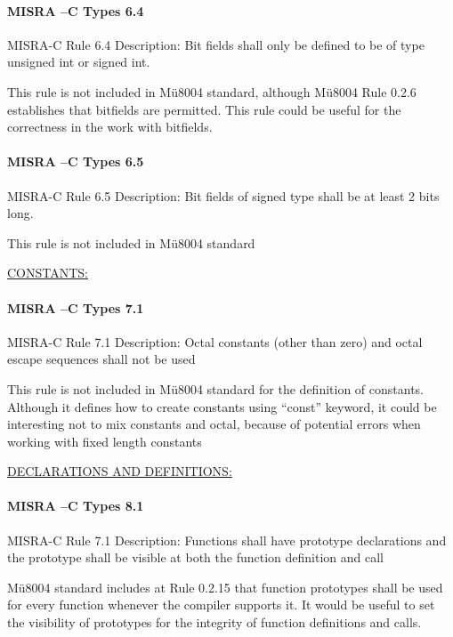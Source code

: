 \paragraph{MISRA –C Types 6.4}
MISRA-C Rule 6.4 Description: Bit fields shall only be defined to be of type unsigned int or signed int.

This rule is not included in Mü8004 standard, although Mü8004 Rule 0.2.6 establishes that bitfields are permitted. This rule could be useful for the correctness in the work with bitfields.

\paragraph{MISRA –C Types 6.5}
MISRA-C Rule 6.5 Description: Bit fields of signed type shall be at least 2 bits long.

This rule is not included in Mü8004 standard

\begin{center}
\textsc{\underline{CONSTANTS:}}
\end{center}

\paragraph{MISRA –C Types 7.1}
MISRA-C Rule 7.1 Description: Octal constants (other than zero) and octal escape sequences shall not be used

This rule is not included in Mü8004 standard for the definition of constants. Although it defines how to create constants using “const” keyword, it could be interesting not to mix constants and octal, because of potential errors when working with fixed length constants

\begin{center}
\textsc{\underline{DECLARATIONS AND DEFINITIONS:}}
\end{center}

\paragraph{MISRA –C Types 8.1}
MISRA-C Rule 7.1 Description: Functions shall have prototype declarations and the prototype shall be visible at both the function definition and call

Mü8004 standard includes at Rule 0.2.15 that function prototypes shall be used for every function whenever the compiler supports it. It would be useful to set the visibility of prototypes for the integrity of function definitions and calls.

